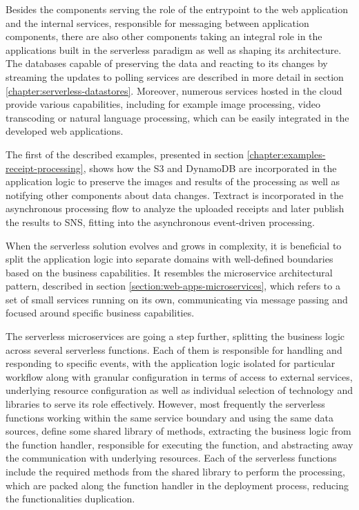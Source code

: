 Besides the components serving the role of the entrypoint to the web application and the internal services, responsible for messaging between application components, there are also other components taking an integral role in the applications built in the serverless paradigm as well as shaping its architecture.
The databases capable of preserving the data and reacting to its changes by streaming the updates to polling services are described in more detail in section \ref{chapter:serverless-datastores}.
Moreover, numerous services hosted in the cloud provide various capabilities, including for example image processing, video transcoding or natural language processing, which can be easily integrated in the developed web applications.

The first of the described examples, presented in section \ref{chapter:examples-receipt-processing}, shows how the S3 and DynamoDB are incorporated in the application logic to preserve the images and results of the processing as well as notifying other components about data changes.
Textract is incorporated in the asynchronous processing flow to analyze the uploaded receipts and later publish the results to SNS, fitting into the asynchronous event-driven processing.

When the serverless solution evolves and grows in complexity, it is beneficial to split the application logic into separate domains with well-defined boundaries based on the business capabilities.
It resembles the microservice architectural pattern, described in section \ref{section:web-apps-microservices}, which refers to a set of small services running on its own, communicating via message passing and focused around specific business capabilities.

The serverless microservices are going a step further, splitting the business logic across several serverless functions.
Each of them is responsible for handling and responding to specific events, with the application logic isolated for particular workflow along with granular configuration in terms of access to external services, underlying resource configuration as well as individual selection of technology and libraries to serve its role effectively.
However, most frequently the serverless functions working within the same service boundary and using the same data sources, define some shared library of methods, extracting the business logic from the function handler, responsible for executing the function, and abstracting away the communication with underlying resources.
Each of the serverless functions include the required methods from the shared library to perform the processing, which are packed along the function handler in the deployment process, reducing the functionalities duplication.

